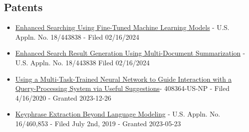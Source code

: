 \documentclass[line,margin]{res}
\begin{document}
\begin{resume}
\subsection{Patents}
\begin{itemize}
    \item  \href{https://www.freepatentsonline.com/y2024/0281446.html}{Enhanced Searching Using Fine-Tuned Machine Learning Models} - U.S. Appln. No. 18/443838 - Filed 02/16/2024
    \item \href{https://www.freepatentsonline.com/y2024/0281487.html}{Enhanced Search Result Generation Using Multi-Document Summarization} - U.S. Appln. No. 18/443838 Filed 02/16/2024
    \item \href{https://patentimages.storage.googleapis.com/3f/e0/ad/fac04c3864220a/US20210326742A1.pdf}{Using a Multi-Task-Trained Neural Network to Guide Interaction with a Query-Processing System via Useful Suggestions}- 408364-US-NP - Filed 4/16/2020 - Granted  2023-12-26
    \item \href{https://patentimages.storage.googleapis.com/67/6d/6a/b27e27d03b8662/US11657223.pdf}{Keyphrase Extraction Beyond Language Modeling} - U.S. Appln. No. 16/460,853 - Filed July 2nd, 2019 - Granted 2023-05-23
\end{itemize}

\end{resume}
\end{document}
